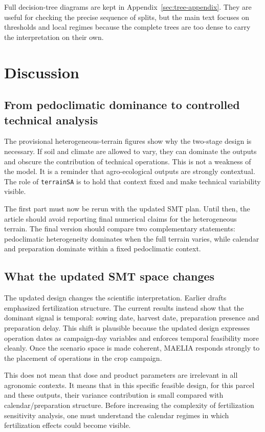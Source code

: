 \documentclass[11pt,a4paper]{article}
\begin{document}
Full decision-tree diagrams are kept in Appendix~\ref{sec:tree-appendix}. They are useful for checking the precise sequence of splits, but the main text focuses on thresholds and local regimes because the complete trees are too dense to carry the interpretation on their own.

\FloatBarrier

\section{Discussion}

\subsection{From pedoclimatic dominance to controlled technical analysis}

The provisional heterogeneous-terrain figures show why the two-stage design is necessary. If soil and climate are allowed to vary, they can dominate the outputs and obscure the contribution of technical operations. This is not a weakness of the model. It is a reminder that agro-ecological outputs are strongly contextual. The role of \texttt{terrainSA} is to hold that context fixed and make technical variability visible.

The first part must now be rerun with the updated SMT plan. Until then, the article should avoid reporting final numerical claims for the heterogeneous terrain. The final version should compare two complementary statements: pedoclimatic heterogeneity dominates when the full terrain varies, while calendar and preparation dominate within a fixed pedoclimatic context.

\subsection{What the updated SMT space changes}

The updated design changes the scientific interpretation. Earlier drafts emphasized fertilization structure. The current results instead show that the dominant signal is temporal: sowing date, harvest date, preparation presence and preparation delay. This shift is plausible because the updated design expresses operation dates as campaign-day variables and enforces temporal feasibility more cleanly. Once the scenario space is made coherent, MAELIA responds strongly to the placement of operations in the crop campaign.

This does not mean that dose and product parameters are irrelevant in all agronomic contexts. It means that in this specific feasible design, for this parcel and these outputs, their variance contribution is small compared with calendar/preparation structure. Before increasing the complexity of fertilization sensitivity analysis, one must understand the calendar regimes in which fertilization effects could become visible.
\end{document}
